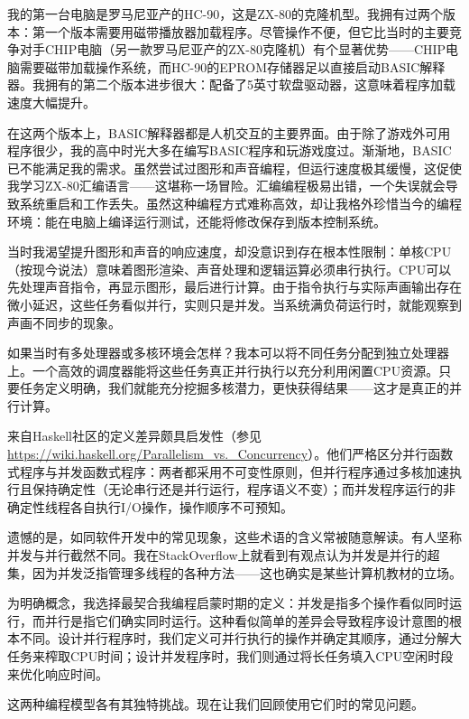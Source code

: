 我的第一台电脑是罗马尼亚产的HC-90，这是ZX-80的克隆机型。我拥有过两个版本：第一个版本需要用磁带播放器加载程序。尽管操作不便，但它比当时的主要竞争对手CHIP电脑（另一款罗马尼亚产的ZX-80克隆机）有个显著优势——CHIP电脑需要磁带加载操作系统，而HC-90的EPROM存储器足以直接启动BASIC解释器。我拥有的第二个版本进步很大：配备了5英寸软盘驱动器，这意味着程序加载速度大幅提升。

在这两个版本上，BASIC解释器都是人机交互的主要界面。由于除了游戏外可用程序很少，我的高中时光大多在编写BASIC程序和玩游戏度过。渐渐地，BASIC已不能满足我的需求。虽然尝试过图形和声音编程，但运行速度极其缓慢，这促使我学习ZX-80汇编语言——这堪称一场冒险。汇编编程极易出错，一个失误就会导致系统重启和工作丢失。虽然这种编程方式难称高效，却让我格外珍惜当今的编程环境：能在电脑上编译运行测试，还能将修改保存到版本控制系统。

当时我渴望提升图形和声音的响应速度，却没意识到存在根本性限制：单核CPU（按现今说法）意味着图形渲染、声音处理和逻辑运算必须串行执行。CPU可以先处理声音指令，再显示图形，最后进行计算。由于指令执行与实际声画输出存在微小延迟，这些任务看似并行，实则只是并发。当系统满负荷运行时，就能观察到声画不同步的现象。

如果当时有多处理器或多核环境会怎样？我本可以将不同任务分配到独立处理器上。一个高效的调度器能将这些任务真正并行执行以充分利用闲置CPU资源。只要任务定义明确，我们就能充分挖掘多核潜力，更快获得结果——这才是真正的并行计算。

来自Haskell社区的定义差异颇具启发性（参见\url{https://wiki.haskell.org/Parallelism_vs._Concurrency}）。他们严格区分并行函数式程序与并发函数式程序：两者都采用不可变性原则，但并行程序通过多核加速执行且保持确定性（无论串行还是并行运行，程序语义不变）；而并发程序运行的非确定性线程各自执行I/O操作，操作顺序不可预知。

遗憾的是，如同软件开发中的常见现象，这些术语的含义常被随意解读。有人坚称并发与并行截然不同。我在StackOverflow上就看到有观点认为并发是并行的超集，因为并发泛指管理多线程的各种方法——这也确实是某些计算机教材的立场。

为明确概念，我选择最契合我编程启蒙时期的定义：并发是指多个操作看似同时运行，而并行是指它们确实同时运行。这种看似简单的差异会导致程序设计意图的根本不同。设计并行程序时，我们定义可并行执行的操作并确定其顺序，通过分解大任务来榨取CPU时间；设计并发程序时，我们则通过将长任务填入CPU空闲时段来优化响应时间。

这两种编程模型各有其独特挑战。现在让我们回顾使用它们时的常见问题。